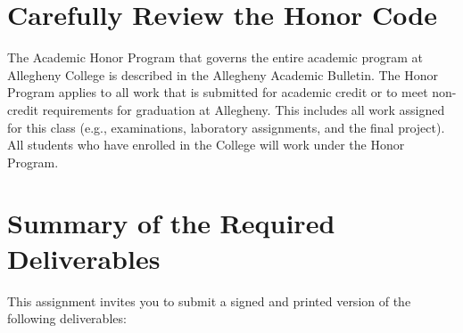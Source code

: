 \section*{Carefully Review the Honor Code}

The Academic Honor Program that governs the entire academic program at Allegheny College is described in the Allegheny
Academic Bulletin. The Honor Program applies to all work that is submitted for academic credit or to meet non-credit
requirements for graduation at Allegheny. This includes all work assigned for this class (e.g., examinations, laboratory
assignments, and the final project). All students who have enrolled in the College will work under the Honor Program.



\section*{Summary of the Required Deliverables}

This assignment invites you to submit a signed and printed version of the following deliverables:

